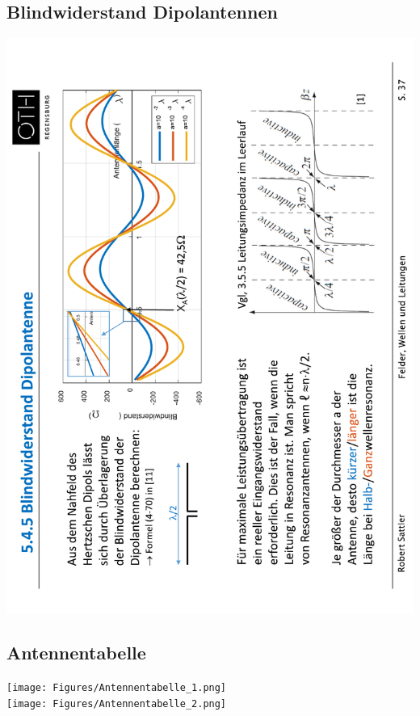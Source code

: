 \subsection{Blindwiderstand Dipolantennen}
\includegraphics[angle=-90, width=0.93\linewidth]{Figures/Dipolantenne_Blindwiderstand.pdf}
\newpage
\subsection{Antennentabelle}\label{sec:Antennentabelle}
\begin{minipage}{1.7\columnwidth}
    \texttt{[image: Figures/Antennentabelle\_1.png]}\\
    \texttt{[image: Figures/Antennentabelle\_2.png]}
\end{minipage}
